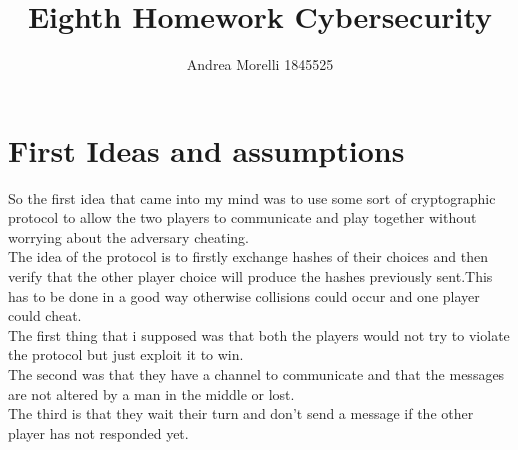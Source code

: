 \documentclass{article}
\title{Eighth Homework Cybersecurity}
\author{Andrea Morelli 1845525}
\date{}
\begin{document}
\maketitle

\section{First Ideas and assumptions}
So the first idea that came into my mind was to use some sort of cryptographic protocol to allow the two players to communicate and play together without worrying about the adversary cheating.\\
The idea of the protocol is to firstly exchange hashes of their choices and then verify that the other player choice will produce the hashes previously sent.This has to be done in a good way otherwise collisions could occur and one player could cheat.\\
The first thing that i supposed was that both the players would not try to violate the protocol but just exploit it to win.\\
The second was that they have a channel to communicate and that the messages are not altered by a man in the middle or lost.\\
The third is that they wait their turn and don't send a message if the other player has not responded yet.\\
\end{document}
